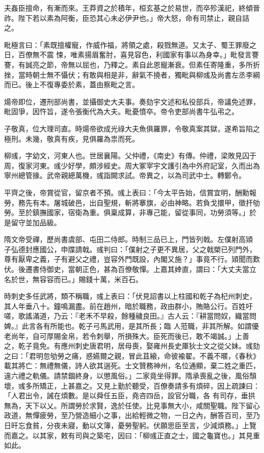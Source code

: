 \begin{pinyinscope}
 夫姦臣擅命，有漸而來。王莽資之於積年，桓玄基之於易世，而卒殄漢祀，終傾晉祚。陛下若以素為阿衡，臣恐其心未必伊尹也。」帝大怒，命有司禁止，親自詰之。



 毗極言曰：「素既擅權寵，作威作福，將領之處，殺戮無道。又太子、蜀王罪廢之日，百僚無不震
 悚，唯素揚眉奮肘，喜見容色，利國家有事以為身幸。」毗發言謇謇，有誠亮之節，帝無以屈也，乃釋之。素自此恩寵漸衰。但素任寄隆重，多所折挫，當時朝士無不懾伏；有敢與相是非，辭氣不撓者，獨毗與柳彧及尚書左丞李綱而已。後上不復專委於素，蓋由察毗之言。



 煬帝即位，遷刑部尚書，並攝御史大夫事。奏劾宇文述和私役部兵，帝議免述罪，毗固爭，因忤旨，遂令張衡代為大夫。毗憂憤卒。帝令吏部尚書牛弘弔之。



 子敬真，位大理司直。時煬帝欲成光祿大夫魚俱羅罪，令敬真案其獄，遂希旨陷之極刑。未幾，敬真有疾，見俱羅為祟而死。



 柳彧，字幼文，河東人也。世居襄陽。父仲禮，《南史》有傳。仲禮，梁敗見囚于周，復家河東。彧少好學，頗涉經史。周大冢宰宇文護引為中外府記室，久而出為寧州總管掾。武帝親總萬機，彧詣闕求試。帝異之，以為司武中士。轉鄭令。



 平齊之後，帝賞從官，留京者不預。彧上表曰：「今太平告始，信賞宜明，酬勳報勞，務先有本。屠城破邑，出自聖規，斬將搴旗，必由神略。若負戈擐甲，徵扞劬勞。至於鎮撫國家，宿衛為重。俱稟成算，非專己能，留從事同，功勞須等。」於是留守並加品級。



 隋文帝受禪，歷尚書虞部、屯田二侍郎。時制三品已上，門皆列戟。左僕射高熲
 子弘德封應國公，申牒請戟。彧判曰：「僕射之子更不異居，父之戟槊已列門外，尊有厭卑之義，子有避父之禮，豈容外門既設，內閣又施？」事竟不行。熲聞而歎伏。後遷書侍御史，當朝正色，甚為百僚敬憚。上嘉其婞直，謂曰：「大丈夫當立名於世，無容容而已。」賜錢十萬，米百石。



 時刺史多任武將，類不稱職，彧上表曰：「伏見詔書以上柱國和乾子為杞州刺史，其人年垂八十。鐘鳴漏盡。前在趙州，暗於職務，政由群小，賄賂公行。百姓吁嗟，歌謠滿道，乃云：『老禾不早殺，餘種穢良田。』古人云：『耕當問奴，織當問婢。』此言各有所能也。乾子弓馬武用，是其所長；臨
 人蒞職，非其所解。如謂優老尚年，自可厚賜金帛，若令刺舉，所損殊大。臣死而後已，敢不竭誠。」上善之，乾子竟免。有應州刺史唐君明，居母喪，娶雍州長史厙狄士文之從父妹。彧劾之曰：「君明忽劬勞之痛，惑嬿爾之親，冒此苴縗，命彼褕翟。不義不暱，《春秋》載其將亡：無禮無儀，詩人欲其遄死。士文贊務神州，名位通顯，棄二姓之重匹，違六禮之軌儀。請禁錮終身，以懲風俗。」二家竟坐得罪。隋承喪亂之後，風俗頹壞，彧多所矯正，上甚嘉之。又見上勤於聽受，百僚奏請多有煩碎，因上疏諫曰：「人君出令，誡在煩數。是以舜任五臣，堯咨四岳，設官分職，各
 有司存，垂拱無為，天下以乂。所謂勞於求賢，逸於任使。比見事無大小，咸關聖職。陛下留心政道，無憚疲勞，至乃營造細小之事，出給輕微之物，一日之內，酬答百司，至乃日旰忘食貧，分夜未寢，動以文簿，憂勞聖躬。伏願思臣至言，少減煩務。」上覽而嘉之。以其家，敕有司與之築宅，因曰：「柳彧正直之士，國之龜寶也。」其見重如此。




\end{pinyinscope}
